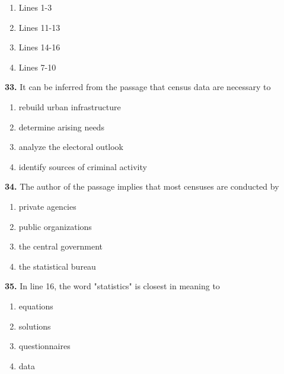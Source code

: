 \documentclass[12pt]{article}
\begin{document}
\begin{enumerate}[label=(\Alph*),leftmargin=*,itemsep=0.2em]
\item Lines 1-3
\item Lines 11-13
\item Lines 14-16
\item Lines 7-10
\end{enumerate}
\par
\vspace{0.25\baselineskip}
\noindent\textbf{33.} It can be inferred from the passage that census data are necessary to
\begin{enumerate}[label=(\Alph*),leftmargin=*,itemsep=0.2em]
\item rebuild urban infrastructure
\item determine arising needs
\item analyze the electoral outlook
\item identify sources of criminal activity
\end{enumerate}
\par
\vspace{0.25\baselineskip}
\noindent\textbf{34.} The author of the passage implies that most censuses are conducted by
\begin{enumerate}[label=(\Alph*),leftmargin=*,itemsep=0.2em]
\item private agencies
\item public organizations
\item the central government
\item the statistical bureau
\end{enumerate}
\par
\vspace{0.25\baselineskip}
\noindent\textbf{35.} In line 16, the word "statistics" is closest in meaning to
\begin{enumerate}[label=(\Alph*),leftmargin=*,itemsep=0.2em]
\item equations
\item solutions
\item questionnaires
\item data
\end{enumerate}
\par
\vspace{0.25\baselineskip}
\end{document}
